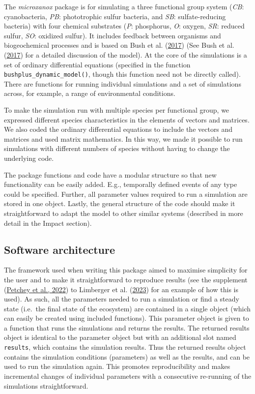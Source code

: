 \documentclass[
]{article}
\begin{document}
The \emph{microxanox} package is for simulating a three functional group system (\emph{CB}: cyanobacteria, \emph{PB}: phototrophic sulfur bacteria, and \emph{SB}: sulfate-reducing bacteria) with four chemical substrates (\emph{P}: phosphorus, \emph{O}: oxygen, \emph{SR}: reduced sulfur, \emph{SO}: oxidized sulfur). It includes feedback between organisms and biogeochemical processes and is based on Bush et al. (\protect\hyperlink{ref-Bush2017}{2017}) (See Bush et al. (\protect\hyperlink{ref-Bush2017}{2017}) for a detailed discussion of the model). At the core of the simulations is a set of ordinary differential equations (specified in the function \texttt{bushplus\_dynamic\_model()}, though this function need not be directly called). There are functions for running individual simulations and a set of simulations across, for example, a range of environmental conditions.

To make the simulation run with multiple species per functional group, we expressed different species characteristics in the elements of vectors and matrices. We also coded the ordinary differential equations to include the vectors and matrices and used matrix mathematics. In this way, we made it possible to run simulations with different numbers of species without having to change the underlying code.

The package functions and code have a modular structure so that new functionality can be easily added. E.g., temporally defined events of any type could be specified. Further, all parameter values required to run a simulation are stored in one object. Lastly, the general structure of the code should make it straightforward to adapt the model to other similar systems (described in more detail in the Impact section).

\hypertarget{software-architecture}{%
\subsection{Software architecture}\label{software-architecture}}

The framework used when writing this package aimed to maximise simplicity for the user and to make it straightforward to reproduce results (see the supplement (\protect\hyperlink{ref-Petchey2022}{Petchey et al., 2022}) to Limberger et al. (\protect\hyperlink{ref-Limberger2022}{2023}) for an example of how this is used). As such, all the parameters needed to run a simulation or find a steady state (i.e.~the final state of the ecosystem) are contained in a single object (which can easily be created using included functions). This parameter object is given to a function that runs the simulations and returns the results. The returned results object is identical to the parameter object but with an additional slot named \texttt{results}, which contains the simulation results. Thus the returned results object contains the simulation conditions (parameters) as well as the results, and can be used to run the simulation again. This promotes reproducibility and makes incremental changes of individual parameters with a consecutive re-running of the simulations straightforward.
\end{document}
